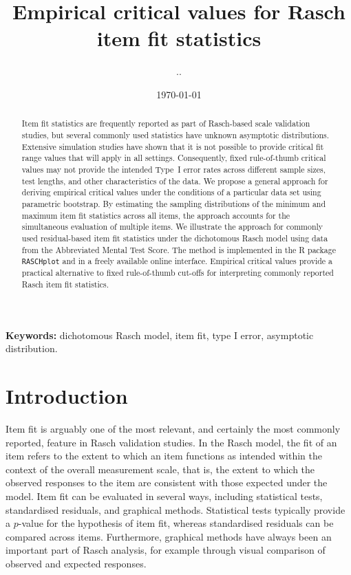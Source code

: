 \documentclass[11pt,a4paper]{article}
\title{Empirical critical values for Rasch item fit statistics}
\author{..}
\date{\today}
\begin{document}
\maketitle


\begin{abstract}
Item fit statistics are frequently reported as part of Rasch-based scale validation studies, but several commonly used statistics have unknown asymptotic distributions.
Extensive simulation studies have shown that it is not possible to provide critical fit range values that will apply in all settings. Consequently, fixed rule-of-thumb critical values may not provide the intended Type~I error rates across different sample sizes, test lengths, and other characteristics of the data. 
We propose a general approach for deriving empirical critical values under the conditions of a particular data set using parametric bootstrap. By estimating the sampling distributions of the minimum and maximum item fit statistics across all items, the approach accounts for the simultaneous evaluation of multiple items. We illustrate the approach for commonly used residual-based item fit statistics under the dichotomous Rasch model using data from the Abbreviated Mental Test Score. 
The method is implemented in the R package \texttt{RASCHplot} and in a freely available online interface. Empirical critical values provide a practical alternative to fixed rule-of-thumb cut-offs for interpreting commonly reported Rasch item fit statistics.
\end{abstract}

\noindent\textbf{Keywords:} dichotomous Rasch model, item fit, type I error, asymptotic distribution.

\section{Introduction}

Item fit is arguably one of the most relevant, and certainly the most commonly reported, feature in Rasch validation studies. In the Rasch model, the fit of an item refers to the extent to which an item functions as intended within the context of the overall measurement scale, that is, the extent to which the observed responses to the item are consistent with those expected under the model. Item fit can be evaluated in several ways, including statistical tests, standardised residuals, and graphical methods. Statistical tests typically provide a $p$-value for the hypothesis of item fit, whereas standardised residuals can be compared across items. Furthermore, graphical methods have always been an important part of Rasch analysis, for example through visual comparison of observed and expected responses.
\end{document}
